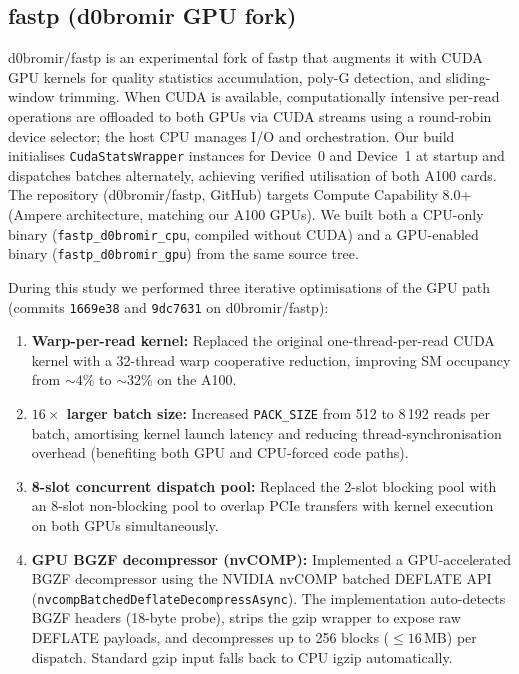 \documentclass[a4paper,12pt]{article}
\begin{document}
\subsection{fastp (d0bromir GPU fork)}
\label{sec:fastp-gpu}

d0bromir/fastp is an experimental fork of fastp that augments it with CUDA GPU
kernels for quality statistics accumulation, poly-G detection, and sliding-window
trimming.  When CUDA is available, computationally intensive per-read operations
are offloaded to both GPUs via CUDA streams using a round-robin device selector;
the host CPU manages I/O and orchestration.  Our build initialises
\texttt{CudaStatsWrapper} instances for Device~0 and Device~1 at startup and
dispatches batches alternately, achieving verified utilisation of both A100
cards.  The repository (d0bromir/fastp, GitHub) targets Compute
Capability 8.0+ (Ampere architecture, matching our A100 GPUs).  We built both
a CPU-only binary (\texttt{fastp\_d0bromir\_cpu}, compiled without CUDA) and a
GPU-enabled binary (\texttt{fastp\_d0bromir\_gpu}) from the same source tree.

During this study we performed three iterative optimisations of the GPU path
(commits \texttt{1669e38} and \texttt{9dc7631} on d0bromir/fastp):
\begin{enumerate}
  \item \textbf{Warp-per-read kernel:} Replaced the original one-thread-per-read
    CUDA kernel with a 32-thread warp cooperative reduction, improving SM
    occupancy from ${\sim}4$\% to ${\sim}32$\% on the A100.
  \item \textbf{$16\times$ larger batch size:} Increased \texttt{PACK\_SIZE}
    from 512 to 8\,192 reads per batch, amortising kernel launch latency and
    reducing thread-synchronisation overhead (benefiting both GPU and CPU-forced
    code paths).
  \item \textbf{8-slot concurrent dispatch pool:} Replaced the 2-slot blocking
    pool with an 8-slot non-blocking pool to overlap PCIe transfers with kernel
    execution on both GPUs simultaneously.
  \item \textbf{GPU BGZF decompressor (nvCOMP):} Implemented a GPU-accelerated
    BGZF decompressor using the NVIDIA nvCOMP batched DEFLATE API
    (\texttt{nvcompBatchedDeflateDecompressAsync}).  The implementation
    auto-detects BGZF headers (18-byte probe), strips the gzip wrapper to
    expose raw DEFLATE payloads, and decompresses up to 256 blocks (${\le}16$\,MB)
    per dispatch.  Standard gzip input falls back to CPU igzip automatically.
\end{enumerate}
\end{document}
